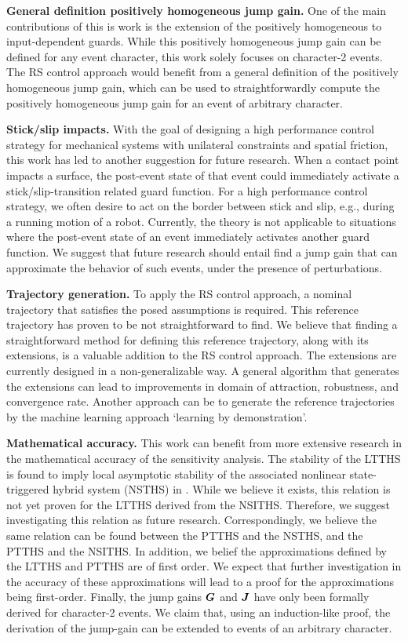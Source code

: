 \documentclass[../DC2019003Bouma.tex]{subfiles}
\begin{document}
\textbf{General definition positively homogeneous jump gain.} One of the main contributions of this is work is the extension of the positively homogeneous to input-dependent guards. While this positively homogeneous jump gain can be defined for any event character, this work solely focuses on character-2 events. The RS control approach would benefit from a general definition of the positively homogeneous jump gain, which can be used to straightforwardly compute the positively homogeneous jump gain for an event of arbitrary character.

\textbf{Stick/slip impacts.} With the goal of designing a high performance control strategy for mechanical systems with unilateral constraints and spatial friction, this work has led to another suggestion for future research. When a contact point impacts a surface, the post-event state of that event could immediately activate a stick/slip-transition related guard function. For a high performance control strategy, we often desire to act on the border between stick and slip, e.g., during a running motion of a robot. Currently, the theory is not applicable to situations where the post-event state of an event immediately activates another guard function. We suggest that future research should entail find a jump gain that can approximate the behavior of such events, under the presence of perturbations.

\textbf{Trajectory generation.} To apply the RS control approach, a nominal trajectory that satisfies the posed assumptions is required. This reference trajectory has proven to be not straightforward to find. We believe that finding a straightforward method for defining this reference trajectory, along with its extensions, is a valuable addition to the RS control approach. The extensions are currently designed in a non-generalizable way. A general algorithm that generates the extensions can lead to improvements in domain of attraction, robustness, and convergence rate. Another approach can be to generate the reference trajectories by the machine learning approach `learning by demonstration'.

\textbf{Mathematical accuracy.} This work can benefit from more extensive research in the mathematical accuracy of the sensitivity analysis. The stability of the LTTHS is found to imply local asymptotic stability of the associated nonlinear state-triggered hybrid system (NSTHS) in \cite{Rijnen2017}. While we believe it exists, this relation is not yet proven for the LTTHS derived from the NSITHS. Therefore, we suggest investigating this relation as future research. Correspondingly, we believe the same relation can be found between the PTTHS and the NSTHS, and the PTTHS and the NSITHS. In addition, we belief the approximations defined by the LTTHS and PTTHS are of first order. We expect that further investigation in the accuracy of these approximations will lead to a proof for the approximations being first-order. Finally, the jump gains ${\boldsymbol{G}}$ and ${\boldsymbol{J}}$ have only been formally derived for character-2 events. We claim that, using an induction-like proof, the derivation of the jump-gain can be extended to events of an arbitrary character.
\end{document}
